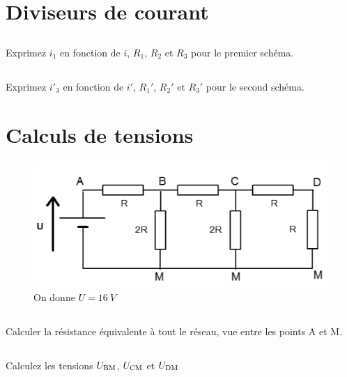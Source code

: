 \documentclass[10pt,a4paper]{article}
\begin{document}
\section{Diviseurs de courant}
\vspace*{-20pt}
\begin{figure}[htbp!]
    \centering
    \hspace{5cm}
\end{figure}

\subsection{}Exprimez $i_1$ en fonction de $i$, $R_1$, $R_2$ et $R_3$ pour le
premier schéma.
\vspace{3cm}
\subsection{}Exprimez $i'_3$ en fonction de $i'$, $R_1'$, $R_2'$ et $R_3'$ pour
le second schéma.
\vspace{3cm}

\newpage

\section{Calculs de tensions}
\vspace*{-20pt}
\begin{figure}[htbp!]
    \centering
    \includegraphics[width=.5\linewidth]{2RtR.png}
    \captionsetup{justification=centering}
    \caption{On donne $U = \SI{16}{V}$}
    \label{fig:ex3}
\end{figure}

\subsection{}Calculer la résistance équivalente à tout le réseau, vue entre les
points A et M.
\vfill
\subsection{}Calculez les tensions $U_{\text{BM}}$, $U _{\text{CM}}$ et $U_{\text{DM}}$
\vfill
\end{document}
